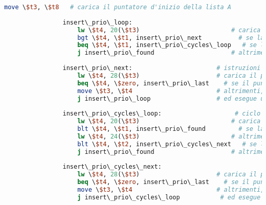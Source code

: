 \begin{center}
\begin{lstlisting}[language=mips, gobble=14, stepnumber=1]
                    move \$t3, \$t8   # carica il puntatore d'inizio della lista A
                    
                insert\_prio\_loop:
                    lw \$t4, 20(\$t3)                         # carica la priorità del task attuale
                    bgt \$t4, \$t1, insert\_prio\_next          # se la il task attuale ha priorità maggiore del task da inserire, passa al prossimo task
                    beq \$t4, \$t1, insert\_prio\_cycles\_loop   # se la priorità è uguale, inizia a scorrere comparando le esecuzioni rimanenti
                    j insert\_prio\_found                     # altrimenti, si è trovato il punto in cui inserire il task
                    
                insert\_prio\_next:                       # istruzioni per passare al prossimo task della lista A
                    lw \$t4, 28(\$t3)                     # carica il puntatore al prossimo task della lista A
                    beq \$t4, \$zero, insert\_prio\_last    # se il puntatore è nullo, il task è da inserire come ultimo della lista
                    move \$t3, \$t4                       # altrimenti, passa al prossimo
                    j insert\_prio\_loop                  # ed esegue un altro ciclo del loop
                    
                insert\_prio\_cycles\_loop:                    # ciclo per la comparazione su esecuzioni rimanenti sulla lista A
                    lw \$t4, 20(\$t3)                         # carica la priorità del task attuale
                    blt \$t4, \$t1, insert\_prio\_found         # se la priorità è minore, la sfilza di task con priorità uguale è terminata e si è trovato dove inserire il task
                    lw \$t4, 24(\$t3)                         # altrimenti, carica le esecuzioni rimanenti del task attuale
                    blt \$t4, \$t2, insert\_prio\_cycles\_next   # se le esecuzioni rimanenti del task attuale sono minori (strettamente) del task da inserire, continua a cercare comparando le esec. rimanenti
                    j insert\_prio\_found                     # altrimenti, si è trovato dove inserire il task
                    
                insert\_prio\_cycles\_next:
                    lw \$t4, 28(\$t3)                     # carica il prossimo elemento della lista A
                    beq \$t4, \$zero, insert\_prio\_last    # se il puntatore è nullo, inserisce il task come ultimo della lista
                    move \$t3, \$t4                       # altrimenti, passa al prossimo
                    j insert\_prio\_cycles\_loop           # ed esegue un altro ciclo (comparando su esecuzioni rimanenti)
                    

\end{lstlisting}
\end{center}
